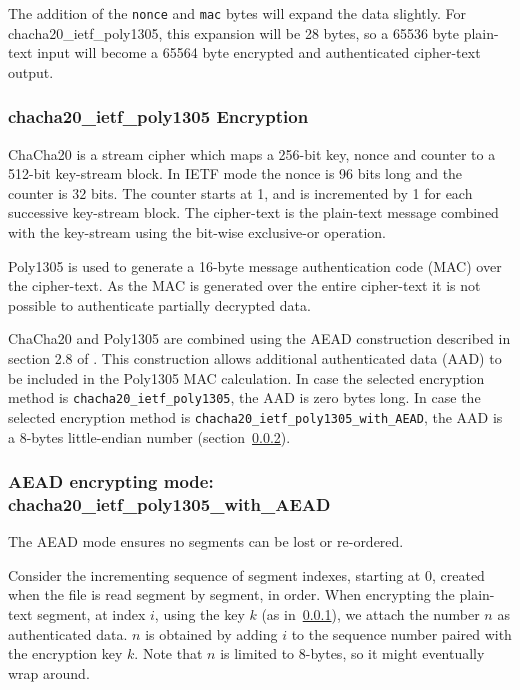 \documentclass[10pt]{article}
\newcommand{\kw}[1]{\texttt{#1}}
\begin{document}
The addition of the \kw{nonce} and \kw{mac} bytes will expand the data slightly.
For chacha20\_ietf\_poly1305, this expansion will be 28 bytes, so a 65536 byte plain-text input will become a 65564
byte encrypted and authenticated cipher-text output.

\subsubsection{chacha20\_ietf\_poly1305 Encryption}\label{data:chacha20_encryption}

ChaCha20 is a stream cipher which maps a 256-bit key, nonce and counter to a 512-bit key-stream block.
In IETF mode the nonce is 96 bits long and the counter is 32 bits.
The counter starts at 1, and is incremented by 1 for each successive key-stream block.
The cipher-text is the plain-text message combined with the key-stream using the bit-wise exclusive-or operation.

Poly1305 is used to generate a 16-byte message authentication code (MAC) over the cipher-text.
As the MAC is generated over the entire cipher-text it is not possible to authenticate partially decrypted data.

ChaCha20 and Poly1305 are combined using the AEAD construction described in section 2.8 of \cite{RFC8439}.
This construction allows additional authenticated data (AAD) to be included in the Poly1305 MAC calculation.
In case the selected encryption method is \kw{chacha20\_ietf\_poly1305}, the AAD is zero bytes long.
In case the selected encryption method is \kw{chacha20\_ietf\_poly1305\_with\_AEAD}, the AAD is a 8-bytes little-endian number (section~\ref{data:AEAD_encrypting_mode}).

\subsubsection{AEAD encrypting mode: chacha20\_ietf\_poly1305\_with\_AEAD}\label{data:AEAD_encrypting_mode}

The AEAD mode ensures no segments can be lost or re-ordered.

Consider the incrementing sequence of segment indexes, starting at
$0$, created when the file is read segment by segment, in order.
%
When encrypting the plain-text segment, at index $i$, using the key
$k$ (as in~\ref{data:chacha20_encryption}), we attach the number $n$ as authenticated data.
%
$n$ is obtained by adding $i$ to the sequence number paired with the
encryption key $k$.
%
Note that $n$ is limited to 8-bytes, so it might eventually wrap
around.
\end{document}

